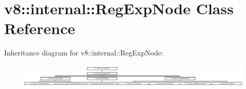 \hypertarget{classv8_1_1internal_1_1RegExpNode}{}\section{v8\+:\+:internal\+:\+:Reg\+Exp\+Node Class Reference}
\label{classv8_1_1internal_1_1RegExpNode}
Inheritance diagram for v8\+:\+:internal\+:\+:Reg\+Exp\+Node\+:\begin{figure}[H]
\begin{center}
\leavevmode
\includegraphics[height=1.163636cm]{classv8_1_1internal_1_1RegExpNode}
\end{center}
\end{figure}
